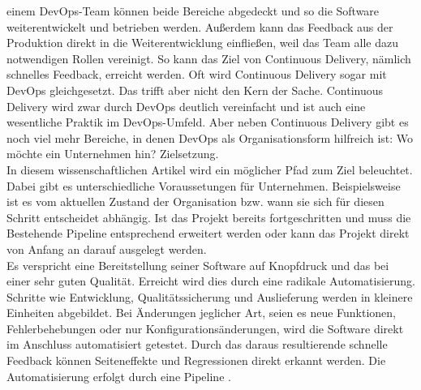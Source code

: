  einem DevOps-Team können beide Bereiche abgedeckt und so die Software weiterentwickelt und betrieben werden. Außerdem kann das Feedback aus der Produktion direkt in die Weiterentwicklung einfließen, weil das Team alle dazu notwendigen Rollen vereinigt. So kann das Ziel von Continuous Delivery, nämlich schnelles Feedback, erreicht werden. Oft wird Continuous Delivery sogar mit DevOps gleichgesetzt. Das trifft aber nicht den Kern der Sache. Continuous Delivery wird zwar durch DevOps deutlich vereinfacht und ist auch eine wesentliche Praktik im DevOps-Umfeld. Aber neben Continuous Delivery gibt es noch viel mehr Bereiche, in denen DevOps als Organisationsform hilfreich ist: Wo möchte ein Unternehmen hin? Zielsetzung. \\In diesem wissenschaftlichen Artikel wird ein möglicher Pfad zum Ziel beleuchtet. Dabei gibt es unterschiedliche Voraussetungen für Unternehmen. Beispielsweise ist es vom aktuellen Zustand der Organisation bzw. wann sie sich für diesen Schritt entscheidet abhängig. Ist das Projekt bereits fortgeschritten und muss die Bestehende Pipeline entsprechend erweitert werden oder kann das Projekt direkt von Anfang an darauf ausgelegt werden.\\
Es verspricht eine Bereitstellung seiner Software auf Knopfdruck und das bei einer sehr guten Qualität. Erreicht wird dies durch eine radikale Automatisierung. Schritte wie Entwicklung, Qualitätssicherung und Auslieferung werden in kleinere Einheiten abgebildet. Bei Änderungen jeglicher Art, seien es neue Funktionen, Fehlerbehebungen oder nur Konfigurationsänderungen, wird die Software direkt im Anschluss automatisiert getestet. Durch das daraus resultierende schnelle Feedback können Seiteneffekte und Regressionen direkt erkannt werden. Die Automatisierung erfolgt durch eine Pipeline \cite{Birk.2014}. 

